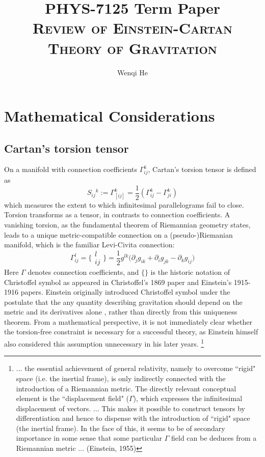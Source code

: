 \documentclass[11pt]{article}
\title{\Large{PHYS-7125 Term Paper} \\ \textsc{\LARGE{Review of Einstein-Cartan Theory of Gravitation}}}
\author{Wenqi He}
\begin{document}
\maketitle
\section{Mathematical Considerations}
\subsection{Cartan's torsion tensor}
On a manifold with connection coefficients $\Gamma^k_{ij}$, Cartan's torsion tensor is defined as
\[ S_{ij}{}^k := \Gamma^k_{[ij]} = \frac{1}{2}(\Gamma^k_{ij} - \Gamma^k_{ji})\]
which measures the extent to which infinitesimal parallelograms fail to close. Torsion transforms as a tensor, in contrasts to connection coefficients. A vanishing torsion, as the fundamental theorem of Riemannian geometry states, leads to a unique metric-compatible connection on a (pseudo-)Riemanian manifold, which is the familiar Levi-Civita connection:
\[ \Gamma^l_{ij} = \{\substack{l\\ij}\} = \frac{1}{2}g^{lk}\Big(\partial_j g_{ik} + \partial_i g_{jk} - \partial_k g_{ij} \Big)\]
Here $\Gamma$ denotes connection coefficients, and $\{\}$ is the historic notation of Christoffel symbol as appeared in Christoffel's 1869 paper and Einstein's 1915-1916 papers. Einstein originally introduced Christoffel symbol under the postulate that the any quantity describing gravitation should depend on the metric and its derivatives alone \cite{einstein1916foundation}, rather than directly from this uniqueness theorem. From a mathematical perspective, it is not immediately clear whether the torsion-free constraint is necessary for a successful theory, as Einstein himself also considered this assumption unnecessary in his later years. \footnote{... the essential achievement of general relativity, namely to overcome ``rigid" space (i.e. the inertial frame), is only indirectly connected with the introduction of a Riemannian metric. The directly relevant conceptual element is the ``displacement field" ($\Gamma$), which expresses the infinitesimal displacement of vectors. ... This makes it possible to construct tensors by differentiation and hence to dispense with the introduction of ``rigid" space (the inertial frame). In the face of this, it seems to be of secondary importance in some sense that some particular $\Gamma$ field can be deduces from a Riemannian metric ... (Einstein, 1955)}
\end{document}
